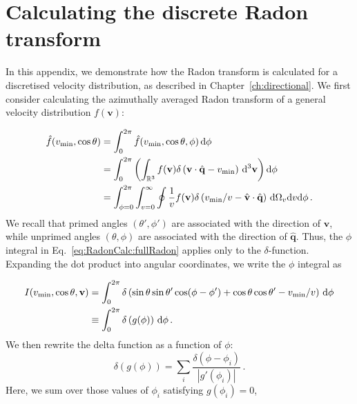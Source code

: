 \chapter[The discrete Radon transform]{Calculating the discrete Radon transform}
\label{ch:RadonCalc}

In this appendix, we demonstrate how the Radon transform is calculated for a discretised velocity distribution, as described in Chapter~\ref{ch:directional}. We first consider calculating the azimuthally averaged Radon transform of a general velocity distribution $f(\textbf{v})$:

\begin{align}
\label{eq:RadonCalc:fullRadon}
\hat{f}(\vmin, \cos\theta) &= \int_0^{2\pi} \hat{f}(\vmin, \cos\theta, \phi) \, \mathrm{d}\phi \notag\\
&= \int_0^{2\pi}\left( \int_{\mathbb{R}^3} f(\mathbf{v}) \delta\left(\mathbf{v}\cdot\hat{\mathbf{q}} - \vmin \right)\, \mathrm{d}^3\mathbf{v} \right) \mathrm{d}\phi \\
&= \int_{\phi = 0}^{2\pi} \int_{v = 0}^{\infty} \oint \frac{1}{v} f(\textbf{v}) \delta\left(v_\textrm{min}/v - \hat{\textbf{v}}\cdot\hat{\textbf{q}}\right) \, \mathrm{d}\Omega_v \mathrm{d}v \mathrm{d}\phi \notag\,.
\end{align}
We recall that primed angles $(\theta',\phi')$ are associated with the direction of $\textbf{v}$, while unprimed angles $(\theta, \phi)$ are associated with the direction of $\hat{\textbf{q}}$. Thus, the $\phi$ integral in Eq.~\ref{eq:RadonCalc:fullRadon} applies only to the $\delta$-function. Expanding the dot product into angular coordinates, we write the $\phi$ integral as

\begin{align}
I(\vmin, \cos\theta, \mathbf{v}) &= \int_{0}^{2\pi} \delta\left(\sin\theta\sin\theta' \cos(\phi-\phi') + \cos\theta\cos\theta' - \vmin/v\right) \label{eq:defI} \, \mathrm{d}\phi \notag\\
&\equiv \int_{0}^{2\pi} \delta\left(g(\phi)\right) \, \mathrm{d}\phi\,.
\end{align}
We then rewrite the delta function as a function of $\phi$:
\begin{equation}
\label{eq:RadonCalc:deltadecomp}
\delta\left(g(\phi)\right) = \sum_{i} \frac{\delta(\phi - \phi_i)}{|g'(\phi_i)|}\,.
\end{equation}
Here, we sum over those values of $\phi_i$ satisfying $g(\phi_i) = 0$,

